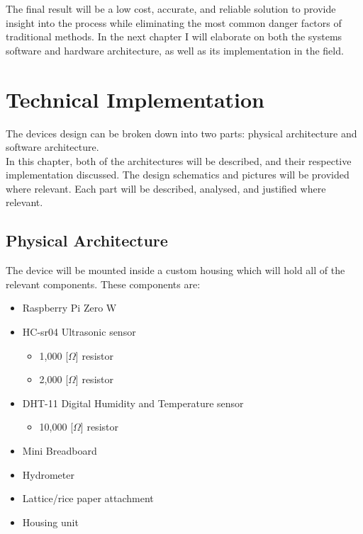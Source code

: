 \documentclass[twoside]{ctuthesis}
\theoremstyle{plain}
\theoremstyle{definition}
\theoremstyle{note}
\begin{document}
The final result will be a low cost, accurate, and reliable solution to provide insight into the process while eliminating the most common danger factors of traditional methods. In the next chapter I will elaborate on both the systems software and hardware architecture, as well as its implementation in the field.


\pagebreak

\begingroup
\renewcommand{\cleardoublepage}{}
\renewcommand{\clearpage}{}
\chapter{Technical Implementation}
\endgroup

The devices design can be broken down into two parts: physical architecture and software architecture.\\
In this chapter, both of the architectures will be described, and their respective implementation discussed. The design schematics and pictures will be provided where relevant. Each part will be described, analysed, and justified where relevant.

\section{Physical Architecture}

The device will be mounted inside a custom housing which will hold all of the relevant components. These components are:

\begin{itemize}
	\item Raspberry Pi Zero W
	\item HC-sr04 Ultrasonic sensor
	\begin{itemize}
		\item 1,000 [$\Omega$] resistor
		\item 2,000 [$\Omega$] resistor
	\end{itemize}
	\item DHT-11 Digital Humidity and Temperature sensor
	\begin{itemize}
		\item 10,000 [$\Omega$] resistor
	\end{itemize}
	\item Mini Breadboard
	\item Hydrometer
	\item Lattice/rice paper attachment
	\item Housing unit
\end{itemize}
\end{document}
